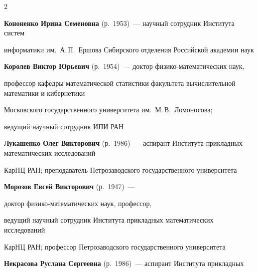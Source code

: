 \begin{multicols}{2}
\noindent

\textbf{Кононенко Ирина Семеновна} (р.\ 1953)~--- научный сотрудник Института сис\-тем 

информатики им.\ А.\,П.~Ершова Сибирского отделения Российской академии наук



\columnbreak






\noindent

\textbf{Королев Виктор Юрьевич} (р.\ 1954)~--- доктор фи\-зи\-ко-ма\-те\-ма\-ти\-че\-ских наук, 

профессор кафедры математической статистики факультета вычислительной математики и кибернетики 

Московского государ\-ст\-вен\-но\-го университета им.\ М.\,В.~Ломоносова; 

ведущий научный сотрудник ИПИ РАН



\vspace*{4pt}





\noindent

\textbf{Лукашенко Олег Викторович} (р.\ 1986)~--- аспирант Института прикладных математических исследований

КарНЦ РАН; преподаватель Петрозаводского государственного университета



\vspace*{4pt}



\noindent

\textbf{Морозов Евсей Викторович} (р.\ 1947)~--- 

доктор фи\-зи\-ко-ма\-те\-ма\-ти\-че\-ских  наук, профессор,

ведущий научный сотрудник  Института прикладных математических исследований

КарНЦ РАН; профессор Петрозаводского государственного университета



\vspace*{4pt}



\noindent

\textbf{Некрасова Руслана Сергеевна} (р.\ 1986)~--- аспирант Института прикладных 


\end{multicols}
